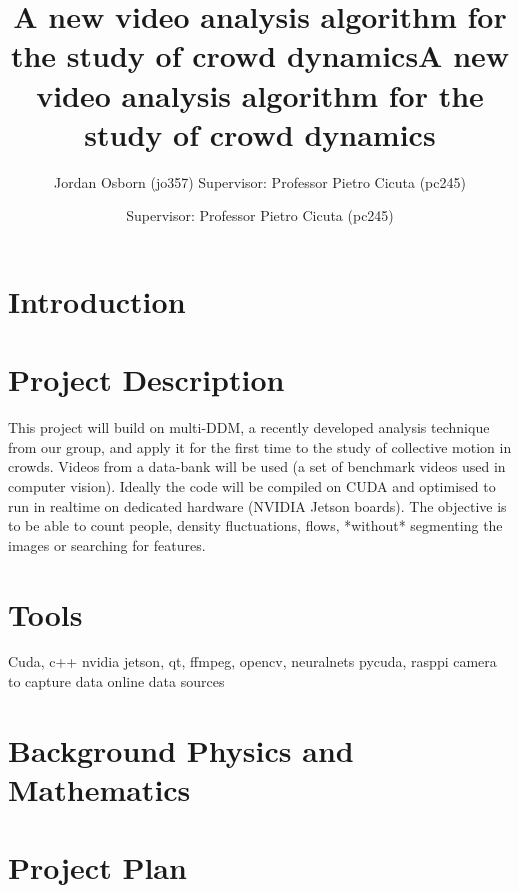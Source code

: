 \documentclass[11pt]{article}
\title{A new video analysis algorithm for the study of crowd dynamics}
\author{Jordan Osborn (jo357) Supervisor: Professor Pietro Cicuta (pc245)}
\begin{document}
\begin{titlingpage}
\maketitle
\end{titlingpage}
\clearpage

\title{A new video analysis algorithm for the study of crowd dynamics}
\author{Supervisor: Professor Pietro Cicuta (pc245)}
\maketitle

\section{Introduction}

\section{Project Description}
This project will build on multi-DDM, a recently developed analysis technique from our group,
and apply it for the first time to the study of collective motion in crowds.
Videos from a data-bank will be used (a set of benchmark videos used in computer vision).
Ideally the code will be compiled on CUDA and optimised to run in realtime on dedicated hardware (NVIDIA Jetson boards).
The objective is to be able to count people, density fluctuations, flows, *without* segmenting the images or searching for features.

\section{Tools}
Cuda, c++ nvidia jetson, qt, ffmpeg, opencv, neuralnets pycuda, rasppi camera to capture data online data sources
\section{Background Physics and Mathematics}

\section{Project Plan}




\end{document}
